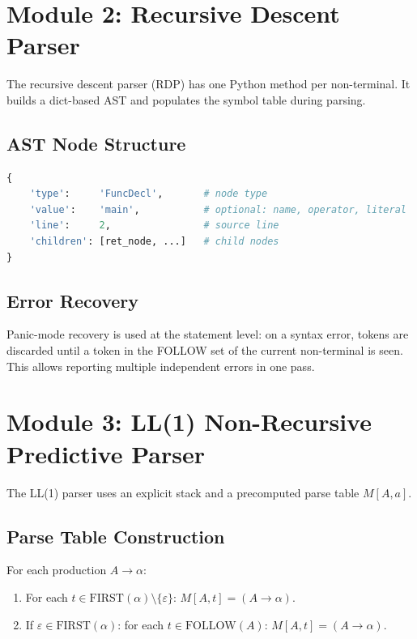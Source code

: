 \documentclass[12pt,a4paper]{article}
\begin{document}
\section{Module 2: Recursive Descent Parser}

The recursive descent parser (RDP) has one Python method per non-terminal.
It builds a dict-based AST and populates the symbol table during parsing.

\subsection{AST Node Structure}

\begin{lstlisting}[style=code,language=Python]
{
    'type':     'FuncDecl',       # node type
    'value':    'main',           # optional: name, operator, literal
    'line':     2,                # source line
    'children': [ret_node, ...]   # child nodes
}
\end{lstlisting}

\subsection{Error Recovery}

Panic-mode recovery is used at the statement level: on a syntax error, tokens
are discarded until a token in the FOLLOW set of the current non-terminal is
seen. This allows reporting multiple independent errors in one pass.

\section{Module 3: LL(1) Non-Recursive Predictive Parser}

The LL(1) parser uses an explicit stack and a precomputed parse table $M[A, a]$.

\subsection{Parse Table Construction}

For each production $A \to \alpha$:
\begin{enumerate}
  \item For each $t \in \text{FIRST}(\alpha) \setminus \{\varepsilon\}$:
        $M[A, t] = (A \to \alpha)$.
  \item If $\varepsilon \in \text{FIRST}(\alpha)$: for each $t \in \text{FOLLOW}(A)$:
        $M[A, t] = (A \to \alpha)$.
\end{enumerate}
\end{document}
